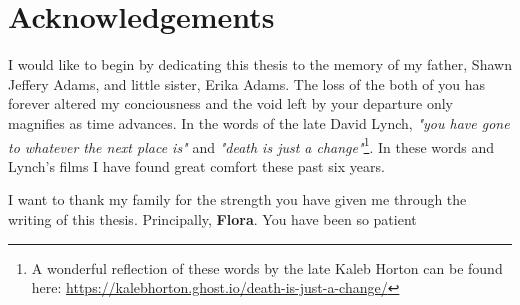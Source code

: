 \chapter*{Acknowledgements}

I would like to begin by dedicating this thesis to the memory of my father, Shawn Jeffery Adams, and little sister, Erika Adams. The loss of the both of you has forever altered my conciousness and the void left by your departure only magnifies as time advances. In the words of the late David Lynch, \textit{"you have gone to whatever the next place is"} and \textit{"death is just a change"}\footnote{A wonderful reflection of these words by the late Kaleb Horton can be found here: \url{https://kalebhorton.ghost.io/death-is-just-a-change/}}. In these words and Lynch's films I have found great comfort these past six years.

I want to thank my family for the strength you have given me through the writing of this thesis. Principally, \textbf{Flora}. You have been so patient

